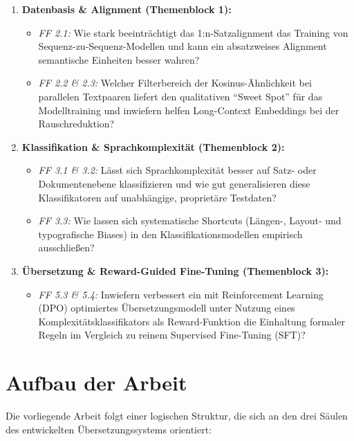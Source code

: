 \begin{enumerate}
    \item \textbf{Datenbasis \& Alignment (Themenblock 1):}
    \begin{itemize}
        \item \textit{FF 2.1:} Wie stark beeinträchtigt das 1:n-Satzalignment das Training von Sequenz-zu-Sequenz-Modellen und kann ein absatzweises Alignment semantische Einheiten besser wahren?
        \item \textit{FF 2.2 \& 2.3:} Welcher Filterbereich der Kosinus-Ähnlichkeit bei parallelen Textpaaren liefert den qualitativen "`Sweet Spot"' für das Modelltraining und inwiefern helfen Long-Context Embeddings bei der Rauschreduktion?
    \end{itemize}
    
    \item \textbf{Klassifikation \& Sprachkomplexität (Themenblock 2):}
    \begin{itemize}
        \item \textit{FF 3.1 \& 3.2:} Lässt sich Sprachkomplexität besser auf Satz- oder Dokumentenebene klassifizieren und wie gut generalisieren diese Klassifikatoren auf unabhängige, proprietäre Testdaten?
        \item \textit{FF 3.3:} Wie lassen sich systematische Shortcuts (Längen-, Layout- und typografische Biases) in den Klassifikationsmodellen empirisch ausschließen?
    \end{itemize}

    \item \textbf{Übersetzung \& Reward-Guided Fine-Tuning (Themenblock 3):}
    \begin{itemize}
        \item \textit{FF 5.3 \& 5.4:} Inwiefern verbessert ein mit Reinforcement Learning (DPO) optimiertes Übersetzungsmodell unter Nutzung eines Komplexitätsklassifikators als Reward-Funktion die Einhaltung formaler Regeln im Vergleich zu reinem Supervised Fine-Tuning (SFT)?
    \end{itemize}
\end{enumerate}

\section{Aufbau der Arbeit}
\label{sec:aufbau_der_arbeit}

Die vorliegende Arbeit folgt einer logischen Struktur, die sich an den drei Säulen des entwickelten Übersetzungssystems orientiert:

